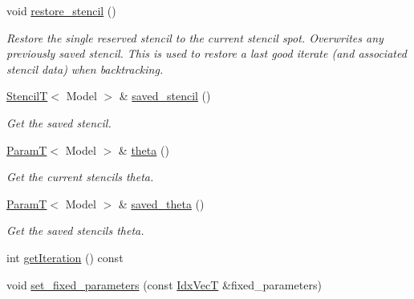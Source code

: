 \begin{DoxyCompactItemize}
void \hyperlink{classmappel_1_1IterativeMaximizer_1_1MaximizerData_a5f65e52de343dbd012c3b3a7b463b792}{restore\+\_\+stencil} ()
\begin{DoxyCompactList}\small\item\em Restore the single reserved stencil to the current stencil spot. Overwrites any previously saved stencil. This is used to restore a last good iterate (and associated stencil data) when backtracking. \end{DoxyCompactList}\item 
\hyperlink{namespacemappel_a3a06598240007876f8c4bf834ad86197}{StencilT}$<$ Model $>$ \& \hyperlink{classmappel_1_1IterativeMaximizer_1_1MaximizerData_ac98f83e1362c3edd65e0681ee93c6da0}{saved\+\_\+stencil} ()
\begin{DoxyCompactList}\small\item\em Get the saved stencil. \end{DoxyCompactList}\item 
\hyperlink{namespacemappel_a667925cb0d6c0e49f2f035cc5a9a6857}{ParamT}$<$ Model $>$ \& \hyperlink{classmappel_1_1IterativeMaximizer_1_1MaximizerData_ac6ed5231a1ac2f4bfdd51a2800212fea}{theta} ()
\begin{DoxyCompactList}\small\item\em Get the current stencil\textquotesingle{}s theta. \end{DoxyCompactList}\item 
\hyperlink{namespacemappel_a667925cb0d6c0e49f2f035cc5a9a6857}{ParamT}$<$ Model $>$ \& \hyperlink{classmappel_1_1IterativeMaximizer_1_1MaximizerData_aedc8670533fe0323a62e7def637875db}{saved\+\_\+theta} ()
\begin{DoxyCompactList}\small\item\em Get the saved stencil\textquotesingle{}s theta. \end{DoxyCompactList}\item 
int \hyperlink{classmappel_1_1IterativeMaximizer_1_1MaximizerData_ab4248a81292964ea9cbfd37964a7b2c1}{get\+Iteration} () const 
\item 
void \hyperlink{classmappel_1_1IterativeMaximizer_1_1MaximizerData_aeff700342cb52da0b5b0d8edb3dac020}{set\+\_\+fixed\+\_\+parameters} (const \hyperlink{namespacemappel_ac63743dcd42180127307cd0e4ecdd784}{Idx\+VecT} \&fixed\+\_\+parameters)
\end{DoxyCompactItemize}
